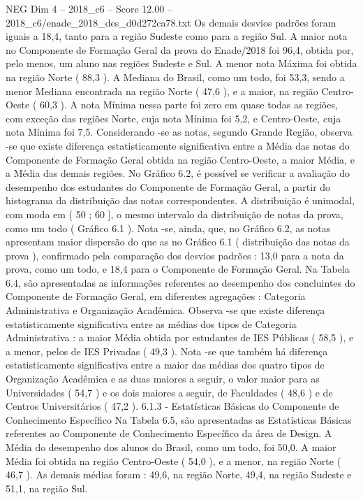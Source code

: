 \begin{textsample}{NEG Dim 4 – 2018\_c6 – Score 12.00 – 2018\_c6/enade\_2018\_des\_d0d272ca78.txt}
Os demais desvios padrões foram iguais a 18,4, tanto para a região Sudeste como para a região Sul.
A maior nota no Componente de Formação Geral da prova do Enade/2018 foi 96,4, obtida por, pelo menos, um aluno nas regiões Sudeste e Sul.
A menor nota Máxima foi obtida na região Norte ( 88,3 ).
A Mediana do Brasil, como um todo, foi 53,3, sendo a menor Mediana encontrada na região Norte ( 47,6 ), e a maior, na região Centro-Oeste ( 60,3 ).
A nota Mínima nessa parte foi zero em quase todas as regiões, com exceção das regiões Norte, cuja nota Mínima foi 5,2, e Centro-Oeste, cuja nota Mínima foi 7,5.
Considerando -se as notas, segundo Grande Região, observa -se que existe diferença estatisticamente significativa entre a Média das notas do Componente de Formação Geral obtida na região Centro-Oeste, a maior Média, e a Média das demais regiões.
No Gráfico 6.2, é possível se verificar a avaliação do desempenho dos estudantes do Componente de Formação Geral, a partir do histograma da distribuição das notas correspondentes.
A distribuição é unimodal, com moda em ( 50 ; 60 ], o mesmo intervalo da distribuição de notas da prova, como um todo ( Gráfico 6.1 ).
Nota -se, ainda, que, no Gráfico 6.2, as notas apresentam maior dispersão do que as no Gráfico 6.1 ( distribuição das notas da prova ), confirmado pela comparação dos desvios padrões : 13,0 para a nota da prova, como um todo, e 18,4 para o Componente de Formação Geral.
Na Tabela 6.4, são apresentadas as informações referentes ao desempenho dos concluintes do Componente de Formação Geral, em diferentes agregações : Categoria Administrativa e Organização Acadêmica.
Observa -se que existe diferença estatisticamente significativa entre as médias dos tipos de Categoria Administrativa : a maior Média obtida por estudantes de IES Públicas ( 58,5 ), e a menor, pelos de IES Privadas ( 49,3 ).
Nota -se que também há diferença estatisticamente significativa entre a maior das médias dos quatro tipos de Organização Acadêmica e as duas maiores a seguir, o valor maior para as Universidades ( 54,7 ) e os dois maiores a seguir, de Faculdades ( 48,6 ) e de Centros Universitários ( 47,2 ). 6.1.3 - Estatísticas Básicas do Componente de Conhecimento Específico Na Tabela 6.5, são apresentadas as Estatísticas Básicas referentes ao Componente de Conhecimento Específico da área de Design.
A Média do desempenho dos alunos do Brasil, como um todo, foi 50,0.
A maior Média foi obtida na região Centro-Oeste ( 54,0 ), e a menor, na região Norte ( 46,7 ).
As demais médias foram : 49,6, na região Norte, 49,4, na região Sudeste e 51,1, na região Sul.

\end{textsample}

